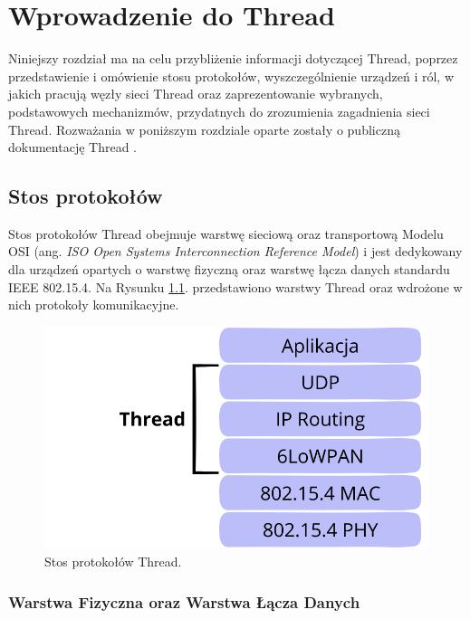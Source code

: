 \chapter{Wprowadzenie do Thread}
\label{cha:wprowadzenie}

Niniejszy rozdział ma na celu przybliżenie informacji dotyczącej Thread, poprzez przedstawienie i omówienie stosu protokołów, wyszczególnienie urządzeń i ról, w jakich pracują węzły sieci Thread oraz zaprezentowanie wybranych, podstawowych mechanizmów, przydatnych do zrozumienia zagadnienia sieci Thread. Rozważania w poniższym rozdziale oparte zostały o publiczną dokumentację Thread \cite{thread-1.3.0}.

\section{Stos protokołów}
\label{sec:thread-stack}

    Stos protokołów Thread obejmuje warstwę sieciową oraz transportową Modelu OSI (ang. \textit{ISO Open Systems Interconnection Reference Model}) i jest dedykowany dla urządzeń opartych o warstwę fizyczną oraz warstwę łącza danych standardu IEEE 802.15.4. Na Rysunku \ref{fig:thread-sprotocol-stack}. przedstawiono warstwy Thread oraz wdrożone w nich protokoły komunikacyjne.

    \begin{figure}[H]
        \centering
        \includegraphics[width=0.8\linewidth]{graphics/thread-protocol-stack.png}
        \caption{Stos protokołów Thread.}
        \label{fig:thread-sprotocol-stack}
    \end{figure}

    \subsection{Warstwa Fizyczna oraz Warstwa Łącza Danych}


